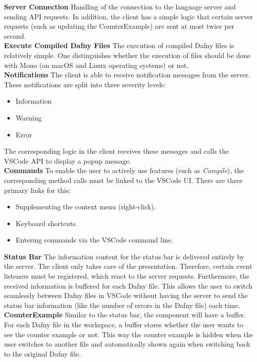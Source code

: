 {\bf Server Connection} \textendash{}
Handling of the connection to the language server and sending API requests.
In addition, the client has a simple logic that certain server requests (such as updating the CounterExample)
are sent at most twice per second. \\

{\bf Execute Compiled Dafny Files} \textendash{}
The execution of compiled Dafny files is relatively simple.
One distinguishes whether the execution of  files should be done with Mono (on macOS and Linux operating systems) or not. \\

{\bf Notifications} \textendash{}
The client is able to receive notification messages from the server.
These notifications are split into three severity levels:
\begin{itemize}
    \item Information
    \item Warning
    \item Error
\end{itemize}
The corresponding logic in the client receives these messages and calls the VSCode API to display a popup message. \\

{\bf Commands} \textendash{}
To enable the user to actively use features (such as \textit{Compile}),
the corresponding method calls must be linked to the VSCode UI.
There are three primary links for this:
\begin{itemize}
    \item Supplementing the context menu (right-click).
    \item Keyboard shortcuts.
    \item Entering commands via the VSCode command line.
\end{itemize}

{\bf Status Bar} \textendash{}
The information content for the status bar is delivered entirely by the server.
The client only takes care of the presentation.
Therefore, certain event listeners must be registered, which react to the server requests.
Furthermore, the received information is buffered for each Dafny file.
This allows the user to switch seamlessly between Dafny files in VSCode
without having the server to send the status bar information
(like the number of errors in the Dafny file) each time.\\

{\bf CounterExample} \textendash{}
Similar to the status bar, the  component will have a buffer.
For each Dafny file in the workspace, a buffer stores whether the user wants to see the counter example or not.
This way the counter example is hidden when the user switches to another file
and automatically shown again when switching back to the original Dafny file.

